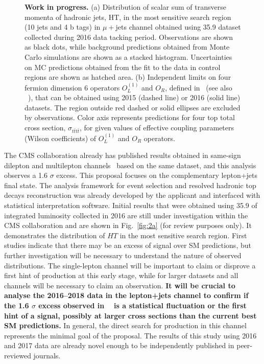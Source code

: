 {\begin{figure}
\begin{subfigure}[t]{0.5\textwidth}
\end{subfigure}%
\caption{\textbf{Work in progress.} (a) Distribution of scalar sum of transverse momenta of hadronic jets, $\mathrm{HT}$, in the most sensitive search region (10 jets and 4 b tags) in $\mu+$jets channel obtained using 35.9 \invfb dataset collected during 2016 data tacking period. Observations are shown as black dots, while background predictions obtained from Monte Carlo simulations are shown as a stacked histogram. Uncertainties on MC predictions obtained from the fit to the data in control regions are shown as hatched area. (b) Independent limits on four fermion dimension 6 operators $O_{L}^{\left(1 \right) }$ and $O_R$, defined in~\cite{DegrandeEFTthesis} (see also ~\cite{Zhang:2017mls}), that can be obtained using 2015 (dashed line) or 2016 (solid line) datasets. The region outside red dashed or solid ellipses are excluded by observations. Color axis represents predictions for four top total cross section, $\sigma_{t\bar{t}t\bar{t}}$, for given values of effective coupling parameters (Wilson coefficients) of $O_{L}^{\left(1 \right) }$ and $O_R$ operators. }
\label{fig:mu}
\end{figure}
The CMS collaboration already has published results obtained in same-sign dilepton and multilepton channels~\cite{Sirunyan:2017roi} based on the same dataset, and this analysis observes a 1.6 $\sigma$ excess. This proposal focuses on the complementary lepton+jets final state. The analysis framework for event selection and resolved hadronic top decays reconstruction was already developed by the applicant and interfaced with statistical interpretation software. Initial results that were obtained using 35.9 \invfb of integrated luminosity collected in 2016 are still under investigation within the CMS collaboration and are shown in Fig.~\ref{fig:2a} (for review purposes only). It demonstrates the distribution of $HT$ in the most sensitive search region. First studies indicate that there may be an excess of signal over SM predictions, but further investigation will be necessary to understand the nature of observed distributions. The single-lepton channel will be important to claim or disprove a first hint of \tttt production at this early stage, while for larger datasets and all channels will be necessary to claim an observation. \textbf{It will be crucial to analyse the 2016--2018 data in the lepton+jets channel to confirm if the 1.6 $\sigma$ excess observed in ~\cite{Sirunyan:2017roi} is a statistical fluctuation or the first hint of a signal, possibly at larger cross sections than the current best SM predictions.} In general, the direct search for \tttt production in this channel represents the minimal goal of the proposal. The results of this study using 2016 and 2017 data are already novel enough to be independently published in peer-reviewed journals. }

